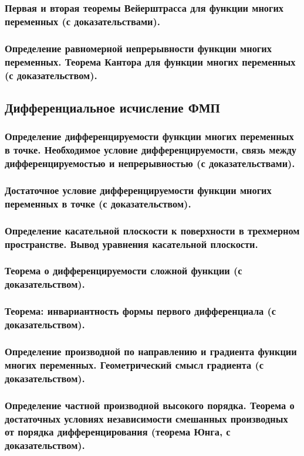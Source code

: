 \documentclass[10pt]{article}
\begin{document}
    \subsubsection{Первая и вторая теоремы Вейерштрасса для функции многих переменных (с доказательствами).}
    \subsubsection{Определение равномерной непрерывности функции многих переменных. Теорема Кантора для функции многих переменных (с доказательством).}
    \subsection{Дифференциальное исчисление ФМП}
    \subsubsection{Определение дифференцируемости функции многих переменных в точке. Необходимое условие дифференцируемости, связь между дифференцируемостью и непрерывностью (с доказательствами).}
    \subsubsection{Достаточное условие дифференцируемости функции многих переменных в точке (с доказательством).}
    \subsubsection{Определение касательной плоскости к поверхности в трехмерном пространстве. Вывод уравнения касательной плоскости.}
    \subsubsection{Теорема о дифференцируемости сложной функции (с доказательством).}
    \subsubsection{Теорема: инвариантность формы первого дифференциала (с доказательством).}
    \subsubsection{Определение производной по направлению и градиента функции многих переменных. Геометрический смысл градиента (с доказательством).}
    \subsubsection{Определение частной производной высокого порядка. Теорема о достаточных условиях независимости смешанных производных от порядка дифференцирования (теорема Юнга, с доказательством).}
\end{document}

